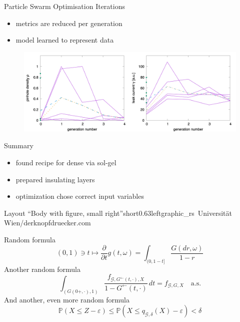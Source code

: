 \documentclass[hyperref={pdfpagelabels=false}, aspectratio=43, t]{beamer}  %
\begin{document}
\begin{frame}{Particle Swarm Optimisation Iterations}
	\begin{itemize}
		\item metrics are reduced per generation
		\item model learned to represent data
	\end{itemize}
	\begin{figure}
		\includegraphics[width=.96\textwidth]{figures/emma-gen.png}
	\end{figure}
\end{frame}

\begin{frame}{Summary}
	\center
	\vspace{2em}
	\begin{itemize}
		\item found recipe for dense  via sol-gel
			\vspace{.5em}
		\item prepared insulating  layers
			\vspace{.5em}
		\item optimization chose correct input variables
	\end{itemize}
\end{frame}

\iffalse
\begin{graphicsFrame}{Layout ``Body with figure, small right''}{short}{0.63}{left}{graphic_rs}{\textcopyright~Universität Wien/derknopfdruecker.com}

		Random formula
		\[
			(0,1)\ni t\mapsto\frac{\partial}{\partial t} g(t,\omega)=\int_{( 0,1-t]}\frac{G(dr,\omega)}{1-r}
		\]
		Another random formula
		\begin{equation}\label{eq1}
			\int_{( G(0+,\cdot),1)}\frac{ f_{\mathcal{G},G^{\leftarrow}(t,\cdot),X}}{1-G^{\leftarrow}(t,\cdot)}\,dt
			= f_{\mathcal{G},G,X}\quad \textrm{a.s.}
		\end{equation}
		And another, even more random formula
		\[
			\mathbb{P}(X\leq Z-\varepsilon)\leq
			\mathbb{P}(X\leq q_{\mathcal{G},\delta}(X)-\varepsilon )< \delta
		\]

\end{graphicsFrame}
													
\end{document}
